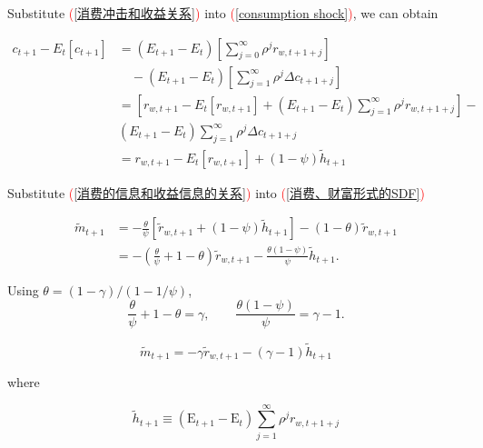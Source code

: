 \documentclass{beamer}
\begin{document}
\begin{frame}[allowframebreaks]
\framebreak

Substitute \textcolor{red}{(\ref{消费冲击和收益关系})} into \textcolor{red}{(\ref{consumption shock})}, we can obtain

\begin{equation}
\begin{aligned}
c_{t+1} - E_t[c_{t+1}] &= (E_{t+1} - E_t) \left[\sum_{j=0}^{\infty} \rho^{j} r_{w, t+1+j} \right] \\
&\quad - (E_{t+1} - E_t) \left[\sum_{j=1}^{\infty} \rho^{j} \Delta c_{t+1+j} \right]\\
&= \left[r_{w,t+1} - E_t[r_{w,t+1}] + \left(E_{t+1}-E_t\right) \sum_{j=1}^{\infty} \rho^j r_{w, t+1+j}\right] - \\
&\left(E_{t+1}-E_t\right) \sum_{j=1}^{\infty} \rho^j \Delta c_{t+1+j} \\
&= r_{w,t+1} - E_t[r_{w,t+1}] + (1-\psi) \widetilde{h}_{t+1}\label{消费的信息和收益信息的关系}
\end{aligned}
\end{equation}


\framebreak

Substitute \textcolor{red}{(\ref{消费的信息和收益信息的关系})} into \textcolor{red}{(\ref{消费、财富形式的SDF})}

\begin{equation*}
\begin{aligned}
\widetilde{m}_{t+1}
&=-\frac{\theta}{\psi}\left[\widetilde{r}_{w,t+1}+(1-\psi)\widetilde{h}_{t+1}\right]
-(1-\theta)\widetilde{r}_{w,t+1}\\
&=-\left(\frac{\theta}{\psi}+1-\theta\right)\widetilde{r}_{w,t+1}
-\frac{\theta(1-\psi)}{\psi}\widetilde{h}_{t+1}.
\end{aligned}
\end{equation*}

Using $\theta=(1-\gamma)/(1-1/\psi)$,
\begin{equation*}
    \frac{\theta}{\psi}+1-\theta=\gamma,
    \qquad
    \frac{\theta(1-\psi)}{\psi}=\gamma-1.
\end{equation*}

    \begin{tcolorbox}[colback=green!5!white, colframe=green!75!black, title=SDF Innovation (Without consumption)]
    \begin{equation*}
        \widetilde{m}_{t+1}=-\gamma \widetilde{r}_{w, t+1}-(\gamma-1) \widetilde{h}_{t+1} 
    \end{equation*}
    \end{tcolorbox}

where 

\begin{equation*}
    \widetilde{h}_{t+1}  \equiv \left(\mathrm{E}_{t+1}-\mathrm{E}_t\right) \sum_{j=1}^{\infty} \rho^j r_{w, t+1+j}
\end{equation*}

\end{frame}
\end{document}
